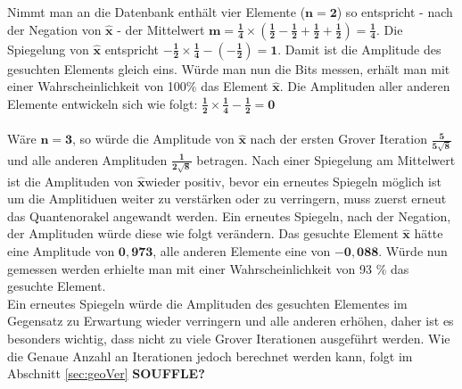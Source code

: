 Nimmt man an die Datenbank enthält vier Elemente ($\mathbf{n=2}$) so entspricht - nach der Negation von $\mathbf{\hat x}$ - der Mittelwert $\mathbf{m = \frac{1}{4} \times (\frac{1}{2}- \frac{1}{2}+ \frac{1}{2} +\frac{1}{2}) = \frac{1}{4}}$. Die Spiegelung von $\mathbf{\hat x}$ entspricht $\mathbf{-\frac{1}{2} \times \frac{1}{4} - (-\frac{1}{2}) = 1}$. Damit ist die Amplitude des gesuchten Elements gleich eins. Würde man nun die Bits messen, erhält man mit einer Wahrscheinlichkeit von 100\% das Element $\mathbf{\hat x}$. Die Amplituden aller anderen Elemente entwickeln sich wie folgt: $\mathbf{\frac{1}{2} \times \frac{1}{4} - \frac{1}{2} = 0}$
\\ \\
Wäre $\mathbf{n = 3}$, so würde die Amplitude von $\mathbf{ \hat x}$ nach der ersten Grover Iteration $\mathbf{\frac{5}{5\sqrt 8}}$ und alle anderen Amplituden $\mathbf{\frac{1}{2\sqrt 8}}$ betragen. Nach einer Spiegelung am Mittelwert ist die Amplituden von $\mathbf{\hat x}$wieder positiv, bevor ein erneutes Spiegeln möglich ist um die Amplitiduen weiter zu verstärken oder zu verringern, muss zuerst erneut das Quantenorakel angewandt werden. Ein erneutes Spiegeln, nach der Negation, der Amplituden würde diese wie folgt verändern. Das gesuchte Element $\mathbf{\hat x}$ hätte eine Amplitude von $\mathbf{0,973}$, alle anderen Elemente eine von $\mathbf{-0, 088}$. Würde nun gemessen werden erhielte man mit einer Wahrscheinlichkeit von 93 \% das gesuchte Element.
\\ Ein erneutes Spiegeln würde die Amplituden des gesuchten Elementes  im Gegensatz zu Erwartung wieder verringern und alle anderen erhöhen, daher ist es besonders wichtig, dass nicht zu viele Grover Iterationen ausgeführt werden. Wie die Genaue Anzahl an Iterationen jedoch berechnet werden kann, folgt im Abschnitt \ref{sec:geoVer}
\textbf{SOUFFLE?}
